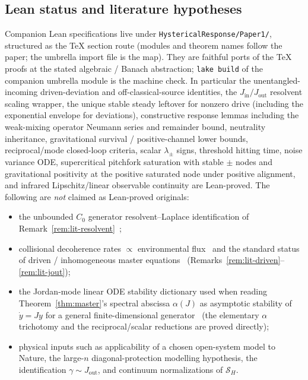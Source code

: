 \documentclass[11pt]{article}
\theoremstyle{definition}
\theoremstyle{remark}
\begin{document}
\subsection*{Lean status and literature hypotheses}
Companion Lean specifications live under \texttt{HystericalResponse/Paper1/}, structured as the TeX section route (modules and theorem names follow the paper; the umbrella import file is the map).
They are faithful ports of the TeX proofs at the stated algebraic / Banach abstraction; \texttt{lake build} of the companion umbrella module is the machine check.
In particular the unentangled-incoming driven-deviation and off-classical-source identities, the $J_{\mathrm{in}}/J_{\mathrm{out}}$ resolvent scaling wrapper, the unique stable steady leftover for nonzero drive (including the exponential envelope for deviations), constructive response lemmas including the weak-mixing operator Neumann series and remainder bound, neutrality inheritance, gravitational survival / positive-channel lower bounds, reciprocal/mode closed-loop criteria, scalar $\lambda_\pm$ signs, threshold hitting time, noise variance ODE, supercritical pitchfork saturation with stable $\pm$ nodes and gravitational positivity at the positive saturated node under positive alignment, and infrared Lipschitz/linear observable continuity are Lean-proved.
The following are \emph{not} claimed as Lean-proved originals:
\begin{itemize}
  \item the unbounded $C_0$ generator resolvent--Laplace identification of Remark~\ref{rem:lit-resolvent}~\cite{pazy1983,engelNagel2000};
  \item collisional decoherence rates $\propto$ environmental flux~\cite{joosZeh1985,gallisFleming1990,hornbergerSipe2003} and the standard status of driven / inhomogeneous master equations~\cite{breuerPetruccione2002,gardinerZoller2004} (Remarks~\ref{rem:lit-driven}--\ref{rem:lit-jout});
  \item the Jordan-mode linear ODE stability dictionary used when reading Theorem~\ref{thm:master}'s spectral abscissa $\alpha(J)$ as asymptotic stability of $\dot y=Jy$ for a general finite-dimensional generator~\cite{perko2001} (the elementary $\alpha$ trichotomy and the reciprocal/scalar reductions are proved directly);
  \item physical inputs such as applicability of a chosen open-system model to Nature, the large-$n$ diagonal-protection modelling hypothesis, the identification $\gamma\sim J_{\mathrm{out}}$, and continuum normalizations of $\mathcal S_H$.
\end{itemize}
\end{document}
